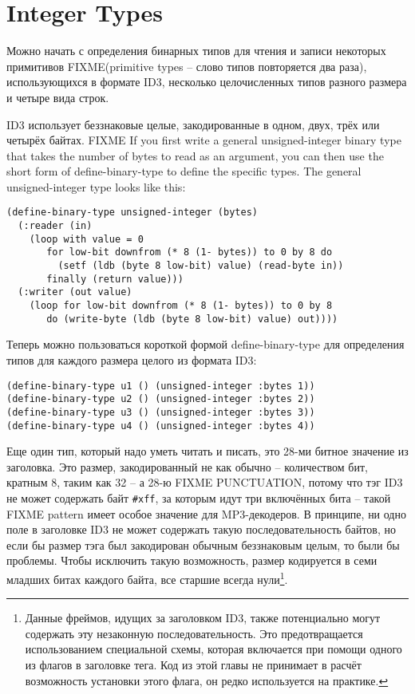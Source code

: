 \section{Integer Types}

Можно начать с определения бинарных типов для чтения и записи некоторых примитивов
FIXME(primitive types -- слово типов повторяется два раза), использующихся в формате ID3,
несколько целочисленных типов разного размера и четыре вида строк.

ID3 использует беззнаковые целые, закодированные в одном, двух, трёх или четырёх байтах.
FIXME If you first write a general unsigned-integer binary type that takes the number of
bytes to read as an argument, you can then use the short form of define-binary-type to
define the specific types. The general unsigned-integer type looks like this:

\begin{lstlisting}
(define-binary-type unsigned-integer (bytes)
  (:reader (in)
    (loop with value = 0
       for low-bit downfrom (* 8 (1- bytes)) to 0 by 8 do
         (setf (ldb (byte 8 low-bit) value) (read-byte in))
       finally (return value)))
  (:writer (out value)
    (loop for low-bit downfrom (* 8 (1- bytes)) to 0 by 8
       do (write-byte (ldb (byte 8 low-bit) value) out))))
\end{lstlisting}

Теперь можно пользоваться короткой формой define-binary-type для определения типов для
каждого размера целого из формата ID3:

\begin{lstlisting}
(define-binary-type u1 () (unsigned-integer :bytes 1))
(define-binary-type u2 () (unsigned-integer :bytes 2))
(define-binary-type u3 () (unsigned-integer :bytes 3))
(define-binary-type u4 () (unsigned-integer :bytes 4))
\end{lstlisting}

Еще один тип, который надо уметь читать и писать, это 28-ми битное значение из заголовка.
Это размер, закодированный не как обычно -- количеством бит, кратным 8, таким как 32 -- а
28-ю FIXME PUNCTUATION, потому что тэг ID3 не может содержать байт \lstinline!#xff!, за
которым идут три включённых бита -- такой FIXME pattern имеет особое значение для
MP3-декодеров.  В принципе, ни одно поле в заголовке ID3 не может содержать такую
последовательность байтов, но если бы размер тэга был закодирован обычным беззнаковым
целым, то были бы проблемы.  Чтобы исключить такую возможность, размер кодируется в семи
младших битах каждого байта, все старшие всегда нули\footnote{Данные фреймов, идущих за
  заголовком ID3, также потенциально могут содержать эту незаконную
  последовательность. Это предотвращается использованием специальной схемы, которая
  включается при помощи одного из флагов в заголовке тега. Код из этой главы не принимает
  в расчёт возможность установки этого флага, он редко используется на практике.}.

